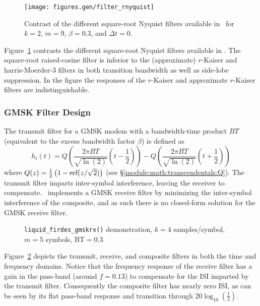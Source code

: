 \begin{figure}
\centering
  \texttt{[image: figures.gen/filter\_rnyquist]}
\caption{Contrast of the different square-root Nyquist filters
         available in \liquid\ for
         $k=2$, $m=9$, $\beta=0.3$, and $\Delta t = 0$.}
\label{fig:module:filter:rnyquist}
\end{figure}
%
Figure~\ref{fig:module:filter:rnyquist} contrasts the different
square-root Nyquist filters available in \liquid.
The square-root raised-cosine filter is inferior to the
(approximate) $r$-Kaiser and harris-Moerder-3 filters in both transition
bandwidth as well as side-lobe suppression.
In the figure the responses of the $r$-Kaiser and approximate $r$-Kaiser
filters are indistinguishable.


\subsubsection{GMSK Filter Design}
\label{module:filter:firdes_gmsk}

%
The transmit filter for a GMSK modem with a bandwidth-time product $BT$
(equivalent to the excess bandwidth factor $\beta$) is defined as
\begin{equation}
\label{eqn:filter:gmsktx}
    h_t(t) = Q\left( \frac{2 \pi BT}{\sqrt{\ln(2)}} \left(t-\frac{1}{2}\right) \right) -
             Q\left( \frac{2 \pi BT}{\sqrt{\ln(2)}} \left(t+\frac{1}{2}\right) \right)
\end{equation}
%
where $Q(z)=\frac{1}{2}\left(1 - \textup{erf}(z/\sqrt{2})\right)$
(see \S\ref{module:math:transcendentals:Q}).
%
The transmit filter imparts inter-symbol interference, leaving the
receiver to compensate.
\liquid\ implements a GMSK receive filter by minimizing the inter-symbol
interference of the composite, and as such
there is no closed-form solution for the GMSK receive filter.
%
\begin{figure}
\centering
{}
\caption{{\tt liquid\_firdes\_gmskrx()} demonstration,
         $k=4$ samples/symbol, $m=5$ symbols, BT$=0.3$}
\label{fig:module:filter:firdes_gmskrx}
\end{figure}
%
Figure~\ref{fig:module:filter:firdes_gmskrx} depicts the transmit,
receive, and composite filters in both the time and frequency domains.
Notice that the frequency response of the receive filter has a gain in
the pass-band (around $f=0.13$) to compensate for the ISI imparted by
the transmit filter.
Consequently the composite filter has nearly zero ISI,
as can be seen by its flat pass-band response
and transition through $20\log_{10}\left(\frac{1}{2}\right)$.

